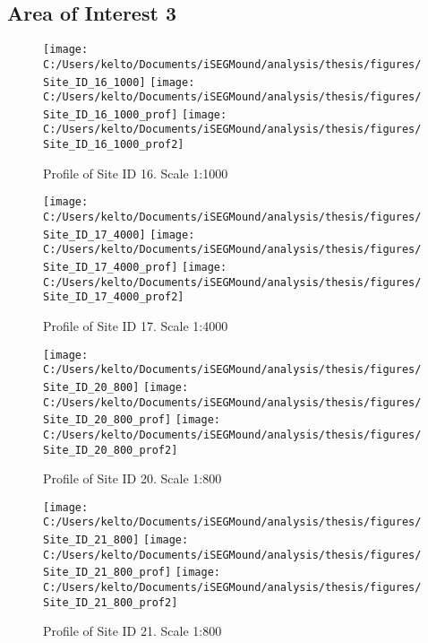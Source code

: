 \documentclass[
  12pt,
]{article}
\begin{document}
\newpage

\hypertarget{area-of-interest-3}{%
\subsection{Area of Interest 3}\label{area-of-interest-3}}

\begin{figure}
\texttt{[image: C:/Users/kelto/Documents/iSEGMound/analysis/thesis/figures/Site\_ID\_16\_1000]} \texttt{[image: C:/Users/kelto/Documents/iSEGMound/analysis/thesis/figures/Site\_ID\_16\_1000\_prof]} \texttt{[image: C:/Users/kelto/Documents/iSEGMound/analysis/thesis/figures/Site\_ID\_16\_1000\_prof2]} \caption{Profile of Site ID 16. Scale 1:1000}\label{fig:FigureAOI3-16}
\end{figure}

\begin{figure}
\texttt{[image: C:/Users/kelto/Documents/iSEGMound/analysis/thesis/figures/Site\_ID\_17\_4000]} \texttt{[image: C:/Users/kelto/Documents/iSEGMound/analysis/thesis/figures/Site\_ID\_17\_4000\_prof]} \texttt{[image: C:/Users/kelto/Documents/iSEGMound/analysis/thesis/figures/Site\_ID\_17\_4000\_prof2]} \caption{Profile of Site ID 17. Scale 1:4000}\label{fig:FigureAOI3-17}
\end{figure}

\begin{figure}
\texttt{[image: C:/Users/kelto/Documents/iSEGMound/analysis/thesis/figures/Site\_ID\_20\_800]} \texttt{[image: C:/Users/kelto/Documents/iSEGMound/analysis/thesis/figures/Site\_ID\_20\_800\_prof]} \texttt{[image: C:/Users/kelto/Documents/iSEGMound/analysis/thesis/figures/Site\_ID\_20\_800\_prof2]} \caption{Profile of Site ID 20. Scale 1:800}\label{fig:FigureAOI3-20}
\end{figure}

\begin{figure}
\texttt{[image: C:/Users/kelto/Documents/iSEGMound/analysis/thesis/figures/Site\_ID\_21\_800]} \texttt{[image: C:/Users/kelto/Documents/iSEGMound/analysis/thesis/figures/Site\_ID\_21\_800\_prof]} \texttt{[image: C:/Users/kelto/Documents/iSEGMound/analysis/thesis/figures/Site\_ID\_21\_800\_prof2]} \caption{Profile of Site ID 21. Scale 1:800}\label{fig:FigureAOI3-21}
\end{figure}
\end{document}
